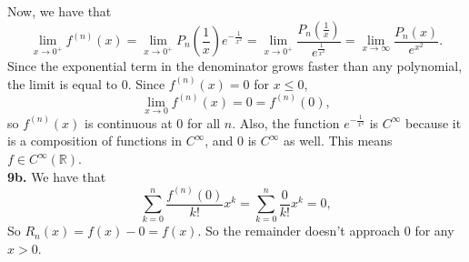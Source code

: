 \documentclass{article}
\newcommand{\R}{\mathbb{R}}
\begin{document}
Now, we have that
$$\lim_{x\to 0^+}f^{(n)}(x) = \lim_{x\to 0^+} P_n\left(\frac{1}{x}\right)e^{-\frac{1}{x^2}} = \lim_{x\to 0^+} \frac{P_n\left(\frac{1}{x}\right)}{e^{\frac{1}{x^2}}} = \lim_{x\to \infty}\frac{P_n(x)}{e^{x^2}}.$$
Since the exponential term in the denominator grows faster than any polynomial, the limit is equal to $0$. Since $f^{(n)}(x) = 0$ for $x \le 0$,
$$\lim_{x\to 0}f^{(n)}(x) = 0 = f^{(n)}(0),$$
so $f^{(n)}(x)$ is continuous at $0$ for all $n$. Also, the function $e^{-\frac{1}{x^2}}$ is $C^\infty$ because it is a composition of functions in $C^\infty$, and $0$ is $C^\infty$ as well. This means $f \in C^\infty(\R)$. \\

\textbf{9b.} We have that
$$\sum_{k = 0}^n \frac{f^{(n)}(0)}{k!}x^k = \sum_{k = 0}^n \frac{0}{k!}x^k = 0,$$
So $R_n(x) = f(x) - 0 = f(x)$. So the remainder doesn't approach $0$ for any $x > 0$.
\end{document}
